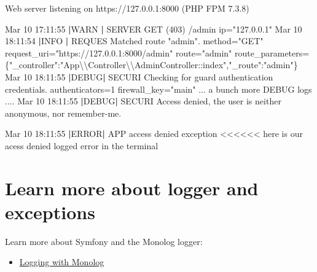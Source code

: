 \documentclass[a4paperpaper,openright]{book}
\newenvironment{Shaded}{}{}
\newcommand{\DataTypeTok}[1]{\textcolor[rgb]{0.56,0.13,0.00}{#1}}
\newcommand{\ExtensionTok}[1]{#1}
\newcommand{\KeywordTok}[1]{\textcolor[rgb]{0.00,0.44,0.13}{\textbf{#1}}}
\newcommand{\NormalTok}[1]{#1}
\newcommand{\OperatorTok}[1]{\textcolor[rgb]{0.40,0.40,0.40}{#1}}
\newcommand{\StringTok}[1]{\textcolor[rgb]{0.25,0.44,0.63}{#1}}
\providecommand{\tightlist}{%
  \setlength{\itemsep}{0pt}\setlength{\parskip}{0pt}}
\begin{document}
\begin{Shaded}
\begin{Highlighting}[]
\NormalTok{ [}\ExtensionTok{OK}\NormalTok{] Web server listening on https://127.0.0.1:8000 (PHP FPM 7.3.8)                                                    }

    \ExtensionTok{Mar}\NormalTok{ 10 17:11:55 }\KeywordTok{|}\ExtensionTok{WARN} \KeywordTok{|} \ExtensionTok{SERVER}\NormalTok{ GET  (403) }\ExtensionTok{/admin}\NormalTok{ ip=}\StringTok{"127.0.0.1"}
    \ExtensionTok{Mar}\NormalTok{ 10 18:11:54 }\KeywordTok{|}\ExtensionTok{INFO} \KeywordTok{|} \ExtensionTok{REQUES}\NormalTok{ Matched route }\StringTok{"admin"}\NormalTok{. method=}\StringTok{"GET"}\NormalTok{ request_uri=}\StringTok{"https://127.0.0.1:8000/admin"}\NormalTok{ route=}\StringTok{"admin"}\NormalTok{ route_parameters=}\DataTypeTok{\{"_controller":"App\textbackslash{}\textbackslash{}Controller\textbackslash{}\textbackslash{}AdminController::index","_route":"admin"\}}
    \ExtensionTok{Mar}\NormalTok{ 10 18:11:55 }\KeywordTok{|}\ExtensionTok{DEBUG}\KeywordTok{|} \ExtensionTok{SECURI}\NormalTok{ Checking for guard authentication credentials. authenticators=1 firewall_key=}\StringTok{"main"}
        \ExtensionTok{...}\NormalTok{ a bunch more DEBUG logs ....}
    \ExtensionTok{Mar}\NormalTok{ 10 18:11:55 }\KeywordTok{|}\ExtensionTok{DEBUG}\KeywordTok{|} \ExtensionTok{SECURI}\NormalTok{ Access denied, the user is neither anonymous, nor remember-me. }

    \ExtensionTok{Mar}\NormalTok{ 10 18:11:55 }\KeywordTok{|}\ExtensionTok{ERROR}\KeywordTok{|} \ExtensionTok{APP}\NormalTok{    access denied exception  }\OperatorTok{<<<<<<}\NormalTok{ here is our acess denied logged error in the terminal }
\end{Highlighting}
\end{Shaded}

\hypertarget{learn-more-about-logger-and-exceptions}{%
\section{Learn more about logger and
exceptions}\label{learn-more-about-logger-and-exceptions}}

Learn more about Symfony and the Monolog logger:

\begin{itemize}
\tightlist
\item
  \href{http://symfony.com/doc/current/logging.html}{Logging with
  Monolog}
\end{itemize}
\end{document}
